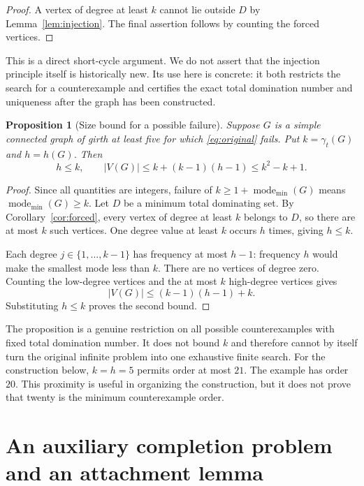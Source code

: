 \documentclass[11pt,a4paper]{article}
\newtheorem{proposition}[theorem]{Proposition}
\theoremstyle{definition}
\theoremstyle{remark}
\newcommand{\gt}{\gamma_t}
\newcommand{\mmin}{\operatorname{mode}_{\min}}
\begin{document}
\begin{proof}
A vertex of degree at least $k$ cannot lie outside $D$ by
Lemma~\ref{lem:injection}. The final assertion follows by counting
the forced vertices.
\end{proof}

This is a direct short-cycle argument. We do not assert that the
injection principle itself is historically new. Its use here is
concrete: it both restricts the search for a counterexample and
certifies the exact total domination number and uniqueness after
the graph has been constructed.

\begin{proposition}[Size bound for a possible failure]\label{prop:size}
Suppose $G$ is a simple connected graph of girth at least five for
which \eqref{eq:original} fails. Put $k=\gt(G)$ and $h=h(G)$.
Then
\begin{equation}\label{eq:size}
        h\le k,\qquad
        |V(G)|\le k+(k-1)(h-1)\le k^2-k+1.
\end{equation}
\end{proposition}

\begin{proof}
Since all quantities are integers, failure of
$k\ge1+\mmin(G)$ means $\mmin(G)\ge k$.
Let $D$ be a minimum total dominating set.
By Corollary~\ref{cor:forced}, every vertex of degree at least $k$
belongs to $D$, so there are at most $k$ such vertices.
One degree value at least $k$ occurs $h$ times, giving $h\le k$.

Each degree $j\in\{1,\ldots,k-1\}$ has frequency at most $h-1$:
frequency $h$ would make the smallest mode less than $k$.
There are no vertices of degree zero. Counting the low-degree
vertices and the at most $k$ high-degree vertices gives
\[
       |V(G)|\le(k-1)(h-1)+k.
\]
Substituting $h\le k$ proves the second bound.
\end{proof}

The proposition is a genuine restriction on all possible
counterexamples with fixed total domination number. It does not
bound $k$ and therefore cannot by itself turn the original infinite
problem into one exhaustive finite search. For the construction
below, $k=h=5$ permits order at most $21$. The example has order
$20$. This proximity is useful in organizing the construction, but
it does not prove that twenty is the minimum counterexample order.

\section{An auxiliary completion problem and an attachment lemma}
\label{sec:attachment}
\end{document}

